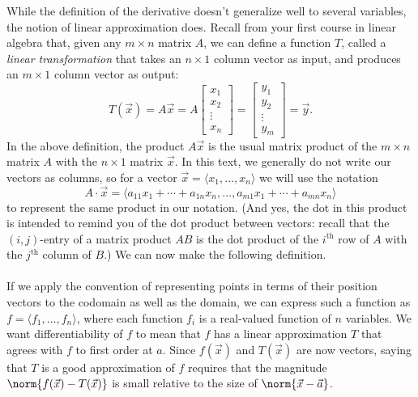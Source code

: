 While the definition of the derivative doesn't generalize well to several variables, the notion of linear approximation does. Recall from your first course in linear algebra that, given any $m\times n$ matrix $A$, we can define a function $T$, called a \emph{linear transformation} that takes an $n\times 1$ column vector as input, and produces an $m\times 1$ column vector as output:
\[
T(\vec{x}) = A\vec{x} = A\begin{bmatrix}x_1\\x_2\\ \vdots\\x_n\end{bmatrix} = \begin{bmatrix}y_1\\y_2\\ \vdots \\y_m\end{bmatrix}=\vec{y}.
\]
In the above definition, the product $A\vec{x}$ is the usual matrix product of the $m\times n$ matrix $A$ with the $n\times 1$ matrix $\vec{x}$. In this text, we generally do not write our vectors as columns, so for a vector $\vec{x}=\langle x_1,\ldots, x_n\rangle$ we will use the notation
\[
A\cdot \vec{x} =\langle a_{11}x_1+\cdots + a_{1n}x_n, \ldots, a_{m1}x_1+\cdots +a_{mn}x_n\rangle
\]
to represent the same product in our notation. (And yes, the dot in this product is intended to remind you of the dot product between vectors: recall that the $(i,j)$-entry of a matrix product $AB$ is the dot product of the $i^{\text{th}}$ row of $A$ with the $j^{\text{th}}$ column of $B$.) We can now make the following definition.\\

\\

If we apply the convention of representing points in terms of their position vectors to the codomain as well as the domain, we can express such a function as $f=\langle f_1,\ldots, f_n\rangle$, where each function $f_i$ is a real-valued function of $n$ variables. We want differentiability of $f$ to mean that $f$ has a linear approximation $T$ that agrees with $f$ to first order at $a$. Since $f(\vec{x})$ and $T(\vec{x})$ are now vectors, saying that $T$ is a good approximation of $f$ requires that the magnitude $\norm{f(\vec{x})-T(\vec{x})}$ is small relative to the size of $\norm{\vec{x}-\vec{a}}$.\\

